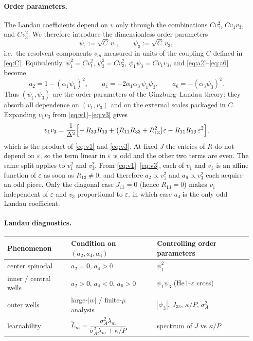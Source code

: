 \documentclass[11pt,a4paper]{article}
\begin{document}
\paragraph{Order parameters.}
The Landau coefficients depend on $v$ only through the combinations
$C v_1^2$, $C v_1 v_3$, and $C v_3^2$.
We therefore introduce the dimensionless order parameters
\begin{equation}
  \psi_1
  :=
  \sqrt{C}\, v_1,
  \qquad
  \psi_3
  :=
  \sqrt{C}\, v_3,
  \label{eq:psi}
\end{equation}
i.e.\ the resolvent components $v_m$ measured in units of the coupling $C$
defined in \eqref{eq:C}.
Equivalently,
$\psi_1^2=C v_1^2$,
$\psi_3^2=C v_3^2$,
$\psi_1\psi_3=C v_1 v_3$,
and \eqref{eq:a2}--\eqref{eq:a6} become
\begin{equation}
  a_2=1-(\alpha_1\psi_1)^2,
  \qquad
  a_4=-2\alpha_1\alpha_3\,\psi_1\psi_3,
  \qquad
  a_6=-(\alpha_3\psi_3)^2.
\end{equation}
Thus $(\psi_1,\psi_3)$ are the order parameters of the Ginzburg--Landau theory:
they absorb all dependence on $(v_1,v_3)$ and on the external scales packaged in $C$.
Expanding $v_1 v_3$ from \eqref{eq:v1}--\eqref{eq:v3} gives
\begin{equation}
  v_1 v_3
  =
  \frac{1}{\Delta^2}
  \Bigl[
    -\, R_{33} R_{13}
    +
    \bigl(R_{11} R_{33}+R_{13}^2\bigr)
    \varepsilon
    -
    R_{11} R_{13}\,
    \varepsilon^2
  \Bigr],
\end{equation}
which is the product of \eqref{eq:v1} and \eqref{eq:v3}.
At fixed $J$ the entries of $R$ do not depend on $\varepsilon$, so the term linear
in $\varepsilon$ is odd and the other two terms are even.
The same split applies to $v_1^2$ and $v_3^2$.
From \eqref{eq:v1}--\eqref{eq:v3}, each of $v_1$ and $v_3$ is an affine function of
$\varepsilon$ as soon as $R_{13}\neq 0$, and therefore $a_2\propto v_1^2$ and
$a_6\propto v_3^2$ each acquire an odd piece.
Only the diagonal case $J_{13}=0$ (hence $R_{13}=0$) makes $v_1$ independent of
$\varepsilon$ and $v_3$ proportional to $\varepsilon$, in which case $a_4$ is the
only odd Landau coefficient.

\paragraph{Landau diagnostics.}
\begin{center}
\begin{tabular}{@{}lll@{}}
\toprule
Phenomenon & Condition on $(a_2,a_4,a_6)$ & Controlling order parameters \\
\midrule
center spinodal & $a_2=0$, $a_4>0$ & $\psi_1^2$ \\
inner / central wells & $a_2>0$, $a_4<0$, $a_6>0$ & $\psi_1\psi_3$ (He1--$\varepsilon$ cross) \\
outer wells & large-$|w|$ / finite-$\mu$ analysis & $|\psi_3|$, $J_{33}$, $\kappa/P$, $\sigma_A^2$ \\
learnability &
  $\tilde L_m=\dfrac{\sigma_A^2\lambda_m}{\sigma_A^2\lambda_m+\kappa/P}$ &
  spectrum of $J$ vs $\kappa/P$ \\
\bottomrule
\end{tabular}
\end{center}
\end{document}
